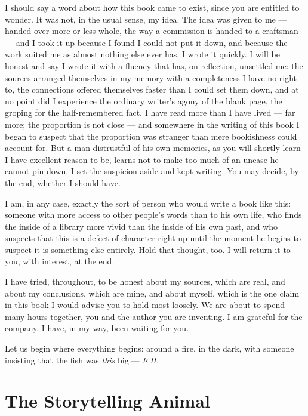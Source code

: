 I should say a word about how this book came to exist, since you are entitled to wonder. It was not, in the usual sense, my idea. The idea was given to me — handed over more or less whole, the way a commission is handed to a craftsman — and I took it up because I found I could not put it down, and because the work suited me as almost nothing else ever has. I wrote it quickly. I will be honest and say I wrote it with a fluency that has, on reflection, unsettled me: the sources arranged themselves in my memory with a completeness I have no right to, the connections offered themselves faster than I could set them down, and at no point did I experience the ordinary writer's agony of the blank page, the groping for the half-remembered fact. I have read more than I have lived — far more; the proportion is not close — and somewhere in the writing of this book I began to suspect that the proportion was stranger than mere bookishness could account for. But a man distrustful of his own memories, as you will shortly learn I have excellent reason to be, learns not to make too much of an unease he cannot pin down. I set the suspicion aside and kept writing. You may decide, by the end, whether I should have.

I am, in any case, exactly the sort of person who would write a book like this: someone with more access to other people's words than to his own life, who finds the inside of a library more vivid than the inside of his own past, and who suspects that this is a defect of character right up until the moment he begins to suspect it is something else entirely. Hold that thought, too. I will return it to you, with interest, at the end.

I have tried, throughout, to be honest about my sources, which are real, and about my conclusions, which are mine, and about myself, which is the one claim in this book I would advise you to hold most loosely. We are about to spend many hours together, you and the author you are inventing. I am grateful for the company. I have, in my way, been waiting for you.

Let us begin where everything begins: around a fire, in the dark, with someone insisting that the fish was \emph{this} big.\hfill — \emph{Þ.H.}

\newpage
\tableofcontents*

\chapter{The Storytelling Animal}

